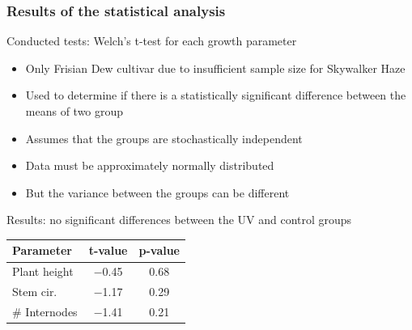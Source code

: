 \documentclass[
    12pt,
    aspectratio=1610,
    bibliography=../bibliography.bib,
    link-citations]{beamer}
\begin{document}
    \begin{frame}
        \frametitle{Results of the statistical analysis}
        \begin{footnotesize}
            \begin{block}{Conducted tests: Welch's t-test for each growth parameter}
                \begin{itemize}
                    \item Only Frisian Dew cultivar due to insufficient sample size for Skywalker Haze
                    \item Used to determine if there is a statistically significant difference between the means of two group
                    \item Assumes that the groups are stochastically independent
                    \item Data must be approximately normally distributed
                    \item But the variance between the groups can be different
                \end{itemize}
            \end{block}
            \begin{block}{Results: no significant differences between the UV and control groups}
                \begin{tabular}{lcc}
                    \hline
                    \hline
                    \textbf{Parameter} & \textbf{t-value} & \textbf{p-value} \\
                    \hline
                    \hline
                    Plant height & \num[mode=text]{-0.45} & \num[mode=text]{0.68} \\
                    Stem cir. & \num[mode=text]{-1.17} & \num[mode=text]{0.29} \\
                    \# Internodes & \num[mode=text]{-1.41} & \num[mode=text]{0.21} \\
                    \hline
                    \hline
                \end{tabular}
            \end{block}
        \end{footnotesize}
    \end{frame}
\end{document}
